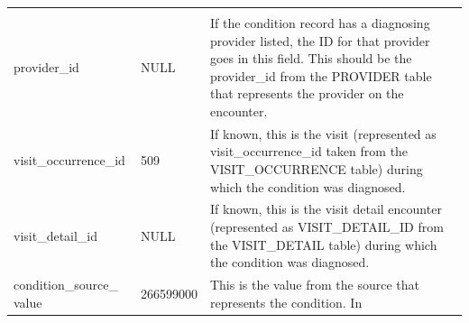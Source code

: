 \documentclass[11pt]{book}
\begin{document}
\begin{longtable}[]{@{}lll@{}}
\begin{minipage}[t]{0.48\columnwidth}
\end{minipage}\tabularnewline
\begin{minipage}[t]{0.28\columnwidth}\raggedright\strut
provider\_id\strut
\end{minipage} & \begin{minipage}[t]{0.16\columnwidth}\raggedright\strut
NULL\strut
\end{minipage} & \begin{minipage}[t]{0.48\columnwidth}\raggedright\strut
If the condition record has a diagnosing provider listed, the ID for
that provider goes in this field. This should be the provider\_id from
the PROVIDER table that represents the provider on the encounter.\strut
\end{minipage}\tabularnewline
\begin{minipage}[t]{0.28\columnwidth}\raggedright\strut
visit\_occurrence\_id\strut
\end{minipage} & \begin{minipage}[t]{0.16\columnwidth}\raggedright\strut
509\strut
\end{minipage} & \begin{minipage}[t]{0.48\columnwidth}\raggedright\strut
If known, this is the visit (represented as visit\_occurrence\_id taken
from the VISIT\_OCCURRENCE table) during which the condition was
diagnosed.\strut
\end{minipage}\tabularnewline
\begin{minipage}[t]{0.28\columnwidth}\raggedright\strut
visit\_detail\_id\strut
\end{minipage} & \begin{minipage}[t]{0.16\columnwidth}\raggedright\strut
NULL\strut
\end{minipage} & \begin{minipage}[t]{0.48\columnwidth}\raggedright\strut
If known, this is the visit detail encounter (represented as
VISIT\_DETAIL\_ID from the VISIT\_DETAIL table) during which the
condition was diagnosed.\strut
\end{minipage}\tabularnewline
\begin{minipage}[t]{0.28\columnwidth}\raggedright\strut
condition\_source\_ value\strut
\end{minipage} & \begin{minipage}[t]{0.16\columnwidth}\raggedright\strut
266599000\strut
\end{minipage} & \begin{minipage}[t]{0.48\columnwidth}\raggedright\strut
This is the value from the source that represents the condition. In

\end{minipage}
\end{longtable}
\end{document}
